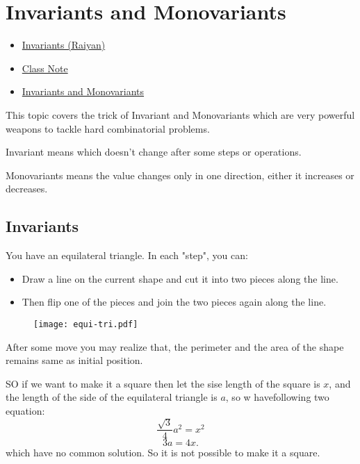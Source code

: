 \chapter{Invariants and Monovariants}%
\label{sec:inv-mono}

\begin{linkb}
   \begin{itemize}
        \item \href{https://www.youtube.com/watch?v=hInrF3biygw}{Invariants (Raiyan)}
        \item \href{https://drive.google.com/file/d/1Ndgs_ftSaG1Ph5sJYsIbwgGczM_NNgrW/view}{Class Note}
        \item \href{https://drive.google.com/file/d/15XjviqGWzT3T_7-W7g2axDdOXiE2le8K/view}{Invariants and Monovariants}
   \end{itemize}
\end{linkb}

This topic covers the trick of Invariant and Monovariants which are very powerful weapons to tackle hard combinatorial problems. 

Invariant means which doesn't change after some steps or operations. 

Monovariants means the value changes only in one direction, either it increases or decreases.

\section{Invariants}

\begin{example}
You have an equilateral triangle. In each "step", you can:
	\begin{itemize}
		\item Draw a line on the current shape and cut it into two pieces along the line.
		\item Then flip one of the pieces and join the two pieces again along the line.
	\end{itemize} 
\end{example}

\begin{figure}[h!]
\centering
		\texttt{[image: equi-tri.pdf]}
\end{figure}

\begin{soln}
After some move you may realize that, the perimeter and the area of the shape remains same as initial position.

SO if we want to make it a square then let the sise length of the square is $x$, and the length of the side of the equilateral triangle is $a$, so w havefollowing two equation:
\[\frac{\sqrt 3}{4}a^2 = x^2\]
\[3a = 4x.\]
which have no common solution. So it is not possible to make it a square.

\end{soln}


